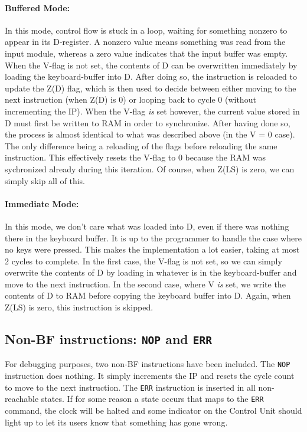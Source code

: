 \paragraph{Buffered Mode:}
In this mode, control flow is stuck in a loop, waiting for something nonzero to appear in its D-register. A nonzero value means something was read from the input module, whereas a zero value indicates that the input buffer was empty. When the V-flag is not set, the contents of D can be overwritten immediately by loading the keyboard-buffer into D. After doing so, the instruction is reloaded to update the Z(D) flag, which is then used to decide between either moving to the next instruction (when Z(D) is 0) or looping back to cycle 0 (without incrementing the IP). When the V-flag \emph{is} set however, the current value stored in D must first be written to RAM in order to synchronize.  After having done so, the process is almost identical to what was described above (in the V = 0 case). The only difference being a reloading of the flags before reloading the same instruction. This effectively resets the V-flag to 0 because the RAM was sychronized already during this iteration. Of course, when Z(LS) is zero, we can simply skip all of this.

\paragraph{Immediate Mode:}
In this mode, we don't care what was loaded into D, even if there was nothing there in the keyboard buffer. It is up to the programmer to handle the case where no keys were pressed. This makes the implementation a lot easier, taking at most 2 cycles to complete. In the first case, the V-flag is not set, so we can simply overwrite the contents of D by loading in whatever is in the keyboard-buffer and move to the next instruction. In the second case, where V \emph{is} set, we write the contents of D to RAM before copying the keyboard buffer into D. Again, when Z(LS) is zero, this instruction is skipped.
  
\subsection{Non-BF instructions: \texttt{NOP} and \texttt{ERR}}
For debugging purposes, two non-BF instructions have been included. The \texttt{NOP} instruction does nothing. It simply increments the IP and resets the cycle count to move to the next instruction. The \texttt{ERR} instruction is inserted in all non-reachable states. If for some reason a state occurs that maps to the \texttt{ERR} command, the clock will be halted and some indicator on the Control Unit should light up to let its users know that something has gone wrong.


